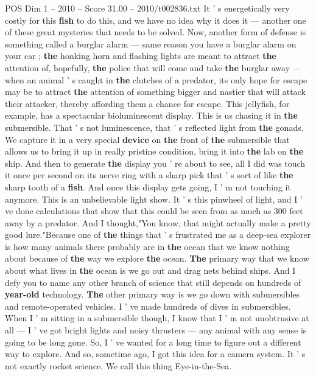 \begin{textsample}{POS Dim 1 – 2010 – Score 31.00 – 2010/t002836.txt}
It ' s energetically very costly for this \textbf{fish} to do this, and we have no idea why it does it — another one of these great mysteries that needs to be solved.
Now, another form of defense is something called a burglar alarm — same reason you have a burglar alarm on your car ; \textbf{the} honking horn and flashing lights are meant to attract \textbf{the} attention of, hopefully, \textbf{the} police that will come and take \textbf{the} burglar away — when an animal ' s caught in \textbf{the} clutches of a predator, its only hope for escape may be to attract \textbf{the} attention of something bigger and nastier that will attack their attacker, thereby affording them a chance for escape.
This jellyfish, for example, has a spectacular bioluminescent display.
This is us chasing it in \textbf{the} submersible.
That ' s not luminescence, that ' s reflected light from \textbf{the} gonads.
We capture it in a very special \textbf{device} on \textbf{the} front of \textbf{the} submersible that allows us to bring it up in really pristine condition, bring it into \textbf{the} lab on \textbf{the} ship.
And then to generate \textbf{the} display you ' re about to see, all I did was touch it once per second on its nerve ring with a sharp pick that ' s sort of like \textbf{the} sharp tooth of a \textbf{fish}.
And once this display gets going, I ' m not touching it anymore.
This is an unbelievable light show.
It ' s this pinwheel of light, and I ' ve done calculations that show that this could be seen from as much as 300 feet away by a predator.
And I thought,"You know, that might actually make a pretty good lure."Because one of \textbf{the} things that ' s frustrated me as a deep-sea explorer is how many animals there probably are in \textbf{the} ocean that we know nothing about because of \textbf{the} way we explore \textbf{the} ocean. \textbf{The} primary way that we know about what lives in \textbf{the} ocean is we go out and drag nets behind ships.
And I defy you to name any other branch of science that still depends on hundreds of \textbf{year-old} technology. \textbf{The} other primary way is we go down with submersibles and remote-operated vehicles.
I ' ve made hundreds of dives in submersibles.
When I ' m sitting in a submersible though, I know that I ' m not unobtrusive at all — I ' ve got bright lights and noisy thrusters — any animal with any sense is going to be long gone.
So, I ' ve wanted for a long time to figure out a different way to explore.
And so, sometime ago, I got this idea for a camera system.
It ' s not exactly rocket science.
We call this thing Eye-in-the-Sea.

\end{textsample}
